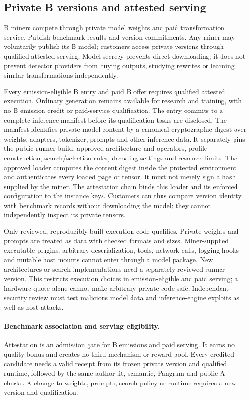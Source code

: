 \subsection{Private B versions and attested serving}\label{attested-b-models}

B miners compete through private model weights and paid transformation
service. Publish benchmark results and version commitments. Any miner may
voluntarily publish its B model; customers access private versions through
qualified attested serving. Model secrecy prevents direct downloading;
it does not prevent detector providers from buying outputs, studying
rewrites or learning similar transformations independently.

Every emission-eligible B entry and paid B offer requires qualified
attested execution. Ordinary generation remains available for research
and training, with no B emission credit or paid-service qualification.
The entry commits to a complete inference manifest before its
qualification tasks are disclosed. The manifest identifies private model
content by a canonical cryptographic digest over weights, adapters,
tokenizer, prompts and other inference data. It separately pins the
public runner build, approved architecture and operators, profile
construction, search/selection rules, decoding settings and resource
limits. The approved loader computes the content digest inside the
protected environment and authenticates every loaded page or tensor.
It must not merely sign a hash supplied by the miner. The attestation
chain binds this loader and its enforced configuration to the instance
keys. Customers can thus compare version identity with benchmark records
without downloading the model; they cannot independently inspect its
private tensors.

Only reviewed, reproducibly built execution code qualifies. Private
weights and prompts are treated as data with checked formats and sizes.
Miner-supplied executable plugins, arbitrary deserialization, tools,
network calls, logging hooks and mutable host mounts cannot enter through
a model package. New architectures or search implementations need a
separately reviewed runner version. This restricts execution choices in
emission-eligible and paid serving; a hardware quote alone cannot make arbitrary private
code safe. Independent security review must test malicious model data
and inference-engine exploits as well as host attacks.

\paragraph{Benchmark association and serving eligibility.}
Attestation is an admission gate for B emissions and paid serving. It
earns no quality bonus and creates no third mechanism or reward pool.
Every credited candidate needs a valid receipt from its frozen private
version and qualified runtime, followed by the same author-fit, semantic,
Pangram and public-A checks. A change to weights, prompts, search policy
or runtime requires a new version and qualification.

